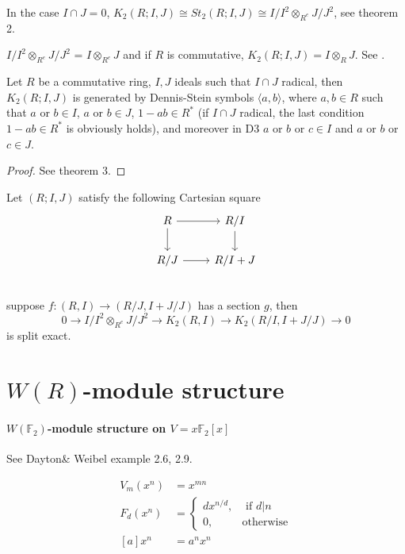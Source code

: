 In the case $I\cap J =0$, $K_2(R;I,J)\cong St_2(R;I,J)\cong I/I^2\otimes_{R^e}J/J^2$, see \cite{Guin-Waléry1981} theorem 2.

\begin{remark}
   $I/I^2\otimes_{R^e}J/J^2$ = $I \otimes_{R^e} J$ and if $R$ is commutative, $K_2(R;I,J)=I\otimes_R J$. See \cite{Guin-Waléry1981}.
\end{remark}

\begin{theorem}
	Let $R$ be a commutative ring, $I,J$ ideals such that $I\cap J$ radical, then $K_2(R;I,J)$ is generated by Dennis-Stein symbols $\langle a,b \rangle$, where $a,b\in R$ such that $a$ or $b\in I$, $a$ or $b\in J$, $1-ab\in R^*$ (if $I\cap J$ radical, the last condition $1-ab\in R^*$ is obviously holds), and moreover in D3 $a$ or $b$ or $c\in I$ and $a$ or $b$ or $c\in J$.
\end{theorem}
\begin{proof}
	See \cite{Guin-Waléry1981} theorem 3.
\end{proof}
\begin{lemma}
	Let $(R;I,J)$ satisfy the following Cartesian square
		\[\begin{tikzcd}
			R \ar[r] \ar[d]& R/I\ar[d]\\
			R/J \ar[r] & R/I+J\\
		\end{tikzcd}\]
	suppose $f\colon (R,I)\longrightarrow (R/J,I+J/J)$ has a section $g$, then
	\[0 \longrightarrow I/I^2\otimes_{R^e}J/J^2\longrightarrow K_2(R,I)\longrightarrow K_2(R/I,I+J/J)\longrightarrow 0\]
	is split exact.
\end{lemma}


\section{\texorpdfstring{$W(R)$}{W(R)}-module structure} %
\label{sec:module_structure}


\paragraph{$W(\mathbb{F}_2)$-module structure on $V=x \mathbb{F}_2[x]$} See Dayton\& Weibel \cite{MR96j:16008} example 2.6, 2.9.

\begin{align*}
 V_m(x^n)&=x^{mn}\\
 F_d(x^n)&=\begin{cases}
 	dx^{n/d},& \mbox{ if $d|n$}\\
 	0,& \mbox{otherwise}
 \end{cases}\\
 [a]x^n&=a^nx^n
 \end{align*}
